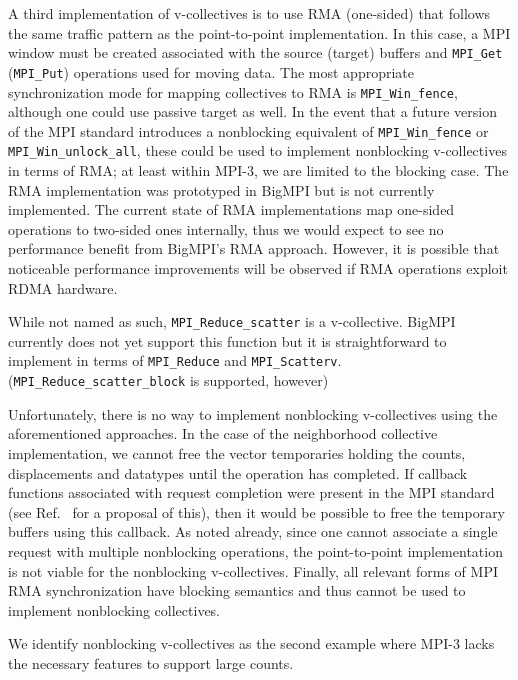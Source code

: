A third implementation of v-collectives is to use RMA (one-sided) that follows
the same traffic pattern as the point-to-point implementation.
In this case, a MPI window must be created associated with the source (target)
buffers and \texttt{MPI\_Get} (\texttt{MPI\_Put}) operations used for moving data.
The most appropriate synchronization mode for mapping collectives to RMA
is \texttt{MPI\_Win\_fence}, although one could use passive target as well.
In the event that a future version of the MPI standard introduces a nonblocking
equivalent of \texttt{MPI\_Win\_fence} or \texttt{MPI\_Win\_unlock\_all}, these
could be used to implement nonblocking v-collectives in terms of RMA; 
at least within MPI-3, we are limited to the blocking case.
The RMA implementation was prototyped in BigMPI but is not currently implemented.
The current state of RMA implementations map one-sided operations to two-sided ones internally, thus we would expect to see no performance benefit from BigMPI's RMA approach.
However, it is possible that noticeable performance improvements will be
observed if RMA operations exploit RDMA hardware.

While not named as such, \texttt{MPI\_Reduce\_scatter} is a v-collective.
BigMPI currently does not yet support this function
but it is straightforward to implement in terms of  \texttt{MPI\_Reduce} and
\texttt{MPI\_Scatterv}. (\texttt{MPI\_Reduce\_scatter\_block} is supported, however)


Unfortunately, there is no way to implement nonblocking v-collectives using 
the aforementioned approaches.  In the case of the neighborhood collective
implementation, we cannot free the vector temporaries holding the counts,
displacements and datatypes until the operation has completed.
If callback functions associated with request completion were present in the
MPI standard (see Ref.~\cite{ticket26} for a proposal of this), then it would
be possible to free the temporary buffers using this callback.
As noted already, since one cannot associate a single request with multiple
nonblocking operations, the point-to-point implementation is not viable
for the nonblocking v-collectives.
Finally, all relevant forms of MPI RMA synchronization have blocking semantics
and thus cannot be used to implement nonblocking collectives.

We identify nonblocking v-collectives as the second example
where MPI-3 lacks the necessary features to support large counts.
